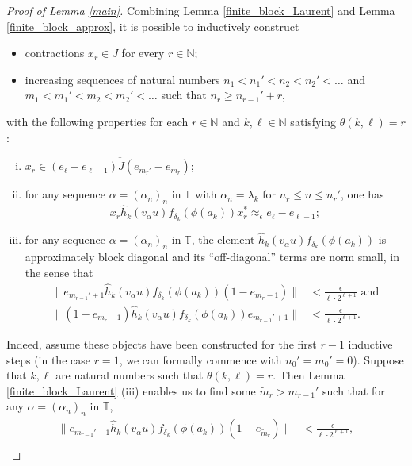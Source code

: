 \documentclass[reqno]{amsart}
\theoremstyle{definition}
\theoremstyle{remark}
\numberwithin{equation}{section}
\theoremstyle{definition}
\begin{document}
\begin{proof}[Proof of Lemma \ref{main}]
Combining Lemma \ref{finite_block_Laurent} and Lemma \ref{finite_block_approx}, it is possible to inductively construct
\begin{itemize} 
\item contractions $x_{r} \in J$ for every $r\in \mathbb{N}$; 
\item increasing sequences of natural numbers $n_1<n_1'<n_2<n_2'<\dots$ and $m_1<m_1'<m_2<m_2'<\dots$ such that $n_{r}\geq n_{r-1}' + r$, 
\end{itemize}
with the following properties for each $r\in\mathbb{N}$ and $k,\ell\in\mathbb{N}$ satisfying $\theta(k, \ell)= r$: 
\begin{enumerate}[(i)] 
\item\label{MainProofC3} $x_r\in \overline{(e_{\ell}-e_{\ell-1})J(e_{m_{r}'}-e_{m_r})}$; 
\item\label{MainProofC4} for any sequence $\alpha = (\alpha_n)_{n}$ in $\mathbb T$ with $\alpha_n=\lambda_k$ for $n_r\leq n\leq n_r'$, one has
\begin{equation}
x_r \hat{h}_{k}(v_{\alpha}u) f_{\delta_{k}}(\phi(a_{k})) x_r^*\approx_{\epsilon} e_{\ell}-e_{\ell-1};
\end{equation}
\item\label{MainProofC2} for any sequence $\alpha = (\alpha_n)_{n}$ in $\mathbb T$, the element $\hat{h}_{k}(v_{\alpha}u) f_{\delta_{k}}(\phi(a_{k}))$ is approximately block diagonal and its ``off-diagonal'' terms are norm small, in the sense that
\begin{align} \label{cross-approx1} 
\Big\| e_{m_{r-1}'+1} \hat{h}_{k}(v_{\alpha}u) f_{\delta_{k}}(\phi(a_{k})) (1-e_{m_r-1}) \Big\| &< {\frac{\epsilon}{\ell\cdot 2^{\ell+1}}} \text{ and} \\ 
\label{cross-approx2} 
\Big\| (1-e_{m_r-1}) \hat{h}_{k}(v_{\alpha}u) f_{\delta_{k}}(\phi(a_{k})) e_{m_{r-1}'+1} \Big\| &< \frac{\epsilon}{\ell\cdot 2^{\ell+1}}. 
\end{align} 
\end{enumerate} 
Indeed, assume these objects have been constructed for the first $r-1$ inductive steps (in the case $r=1$, we can formally commence with $n_0'=m_0'=0$). Suppose that $k, \ell$ are natural numbers such that $\theta(k, \ell) = r$. Then Lemma \ref{finite_block_Laurent} (iii) enables us to find some $\tilde{m}_r > m_{r-1}'$ such that for any $\alpha = (\alpha_{n})_{n}$ in $\mathbb{T}$, 
\begin{align}
\label{cross_approx3}
\Big\| e_{m_{r-1}'+1} \hat{h}_{k} (v_{\alpha} u) f_{\delta_{k}} (\phi(a_{k})) (1-e_{\tilde{m}_r}) \Big\| &< \frac{\epsilon}{\ell\cdot 2^{\ell+1}},\\

\end{align}
\end{proof}
\end{document}
